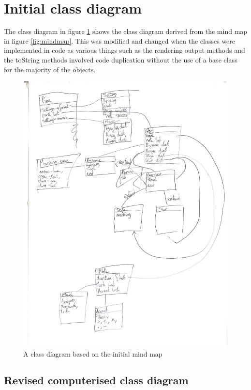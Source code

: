 \begin{appendices}
\section{Initial class diagram}
The class diagram in figure \ref{fig:handclass} shows the class diagram derived from the mind map in figure \ref{fig:mindmap}. This was modified and changed when the classes were implemented in code as various things such as the rendering output methods and the toString methods involved code duplication without the use of a base class for the majority of the objects.
\begin{figure}[H]
\centering
\includegraphics[width=400pt]{class-diagram}
\caption{A class diagram based on the initial mind map}
\label{fig:handclass}
\end{figure}
\begin{landscape}
\section{Revised computerised class diagram}

\end{landscape}
\end{appendices}

